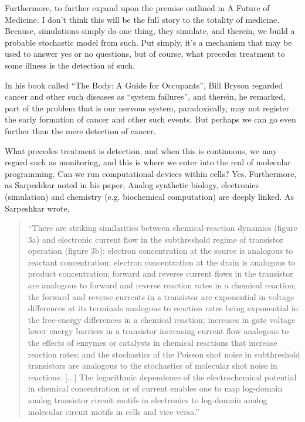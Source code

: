 Furthermore, to further expand upon the premise outlined in A Future of Medicine. I don't think this will be the full story to the totality of medicine. Because, simulations simply do one thing, they simulate, and therein, we build a probable stochastic model from such. Put simply, it's a mechanism that may be used to answer yes or no questions, but of course, what precedes treatment to some illness is the detection of such. 

In his book called ``The Body: A Guide for Occupants'', Bill Bryson regarded cancer and other such diseases as ``system failures'', and therein, he remarked, part of the problem that is our nervous system, paradoxically, may not register the early formation of cancer and other such events. But perhaps we can go even further than the mere detection of cancer.

What precedes treatment is detection, and when this is continuous, we may regard such as monitoring, and this is where we enter into the real of molecular programming. Can we run computational devices within cells? Yes. Furthermore, as Sarpeshkar noted in his paper, Analog synthetic biology, electronics (simulation) and chemistry (e.g. biochemical computation) are deeply linked. As Sarpeshkar wrote,
\begin{quotation}
    ``There are striking similarities between chemical-reaction dynamics (figure 3a) and electronic current flow in the subthreshold regime of transistor operation (figure 3b): electron concentration at the source is analogous to reactant concentration; electron concentration at the drain is analogous to product concentration; forward and reverse current flows in the transistor are analogous to forward and reverse reaction rates in a chemical reaction; the forward and reverse currents in a transistor are exponential in voltage differences at its terminals analogous to reaction rates being exponential in the free-energy differences in a chemical reaction; increases in gate voltage lower energy barriers in a transistor increasing current flow analogous to the effects of enzymes or catalysts in chemical reactions that increase reaction rates; and the stochastics of the Poisson shot noise in subthreshold transistors are analogous to the stochastics of molecular shot noise in reactions. [...] The logarithmic dependence of the electrochemical potential in chemical concentration or of current enables one to map log-domain analog transistor circuit motifs in electronics to log-domain analog molecular circuit motifs in cells and vice versa.''
\end{quotation}

